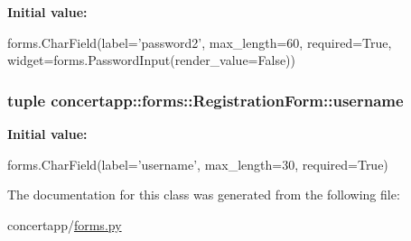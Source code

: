 \label{classconcertapp_1_1forms_1_1_registration_form_afa9b67cdb3d9db3e8c2d7899cc399d5c}
{\bfseries Initial value:}
\begin{DoxyCode}
forms.CharField(label='password2',
                            max_length=60,
                            required=True,
                            widget=forms.PasswordInput(render_value=False))
\end{DoxyCode}
\hypertarget{classconcertapp_1_1forms_1_1_registration_form_a1feae87227acf1bab84f794ddd92f9bc}{
\subsubsection[{username}]{\setlength{\rightskip}{0pt plus 5cm}tuple {\bf concertapp::forms::RegistrationForm::username}}}
\label{classconcertapp_1_1forms_1_1_registration_form_a1feae87227acf1bab84f794ddd92f9bc}
{\bfseries Initial value:}
\begin{DoxyCode}
forms.CharField(label='username',
                        max_length=30,
                        required=True)
\end{DoxyCode}


The documentation for this class was generated from the following file:\begin{DoxyCompactItemize}
\item 
concertapp/\hyperlink{forms_8py}{forms.py}\end{DoxyCompactItemize}
